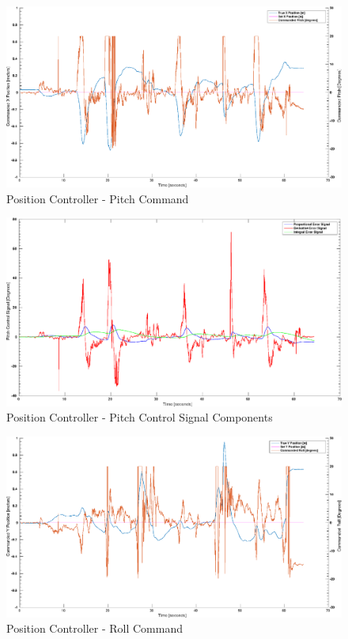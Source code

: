 \documentclass[11pt, twocolumn]{article}
\begin{document}
\begin{figure}
	\centering
	\includegraphics[width=\textwidth]{images/PID_Pitch_x_true_and_obs.eps}
	\caption{Position Controller - Pitch Command}
	\label{fig:pid_roll}
\end{figure}

\begin{figure}
	\centering
	\includegraphics[width=\textwidth]{images/PID_Pitch_Controls.eps}
	\caption{Position Controller - Pitch Control Signal Components}
	\label{fig:pid_roll}
\end{figure}

\begin{figure}
	\centering
	\includegraphics[width=\textwidth]{images/PID_Roll_y_true_and_obs.eps}
	\caption{Position Controller - Roll Command}
	\label{fig:pid_roll}
\end{figure}
\end{document}
